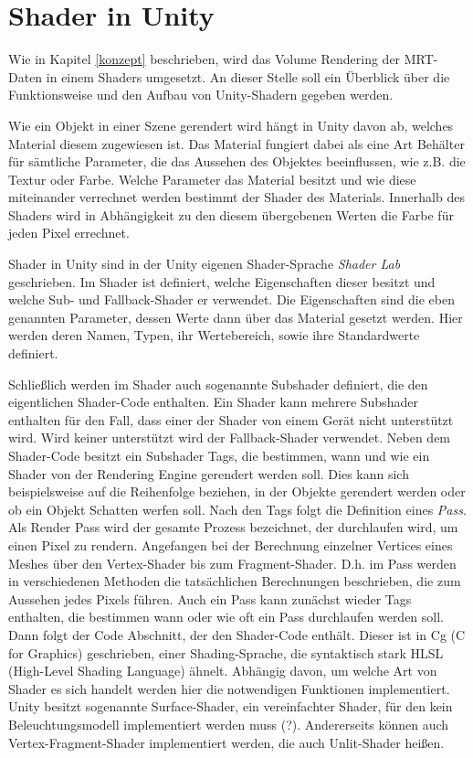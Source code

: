 

\section{Shader in Unity}

Wie in Kapitel \ref{konzept} beschrieben, wird das Volume Rendering der MRT-Daten in einem Shaders umgesetzt. An dieser Stelle soll ein Überblick über die Funktionsweise und den Aufbau von Unity-Shadern gegeben werden. 

Wie ein Objekt in einer Szene gerendert wird hängt in Unity davon ab, welches Material diesem zugewiesen ist. Das Material fungiert dabei als eine Art Behälter für sämtliche Parameter, die das Aussehen des Objektes beeinflussen, wie z.B. die Textur oder Farbe. Welche Parameter das Material besitzt und wie diese miteinander verrechnet werden bestimmt der Shader des Materials. Innerhalb des Shaders wird in Abhängigkeit zu den diesem übergebenen Werten die Farbe für jeden Pixel errechnet. 

Shader in Unity sind in der Unity eigenen Shader-Sprache \textit{Shader Lab} geschrieben. Im Shader ist definiert, welche Eigenschaften dieser besitzt und welche Sub- und Fallback-Shader er verwendet.
Die Eigenschaften sind die eben genannten Parameter, dessen Werte dann über das Material gesetzt werden. Hier werden deren Namen, Typen, ihr Wertebereich, sowie ihre Standardwerte definiert. 

Schließlich werden im Shader auch sogenannte Subshader definiert, die den eigentlichen Shader-Code enthalten.
Ein Shader kann mehrere Subshader enthalten für den Fall, dass einer der Shader von einem Gerät nicht unterstützt wird. Wird keiner unterstützt wird der Fallback-Shader verwendet. 
Neben dem Shader-Code besitzt ein Subshader Tags, die bestimmen, wann und wie ein Shader von der Rendering Engine gerendert werden soll. Dies kann sich beispielsweise auf die Reihenfolge beziehen, in der Objekte gerendert werden oder ob ein Objekt Schatten werfen soll. 
Nach den Tags folgt die Definition eines \textit{Pass}. Als Render Pass wird der gesamte Prozess bezeichnet, der durchlaufen wird, um einen Pixel zu rendern. Angefangen bei der Berechnung einzelner Vertices eines Meshes über den Vertex-Shader bis zum Fragment-Shader. D.h. im Pass werden in verschiedenen Methoden die tatsächlichen Berechnungen beschrieben, die zum Aussehen jedes Pixels führen. 
Auch ein Pass kann zunächst wieder Tags enthalten, die bestimmen wann oder wie oft ein Pass durchlaufen werden soll. 
Dann folgt der Code Abschnitt, der den Shader-Code enthält. Dieser ist in Cg (C for Graphics)
 geschrieben, einer Shading-Sprache, die syntaktisch stark HLSL (High-Level Shading Language) ähnelt. 
Abhängig davon, um welche Art von Shader es sich handelt werden hier die notwendigen Funktionen implementiert. Unity besitzt sogenannte Surface-Shader, ein vereinfachter Shader, für den kein Beleuchtungsmodell implementiert werden muss (?). Andererseits können auch Vertex-Fragment-Shader implementiert werden, die auch Unlit-Shader heißen. 

